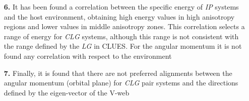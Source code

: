 \begin{enumerate}
\item[\textbf{6.}] It has been found a correlation between the specific
energy of \textit{IP} systems and the host environment, obtaining high
energy values in high anisotropy regions and lower values in middle 
anisotropy zones. This correlation selects a range of energy for 
\textit{CLG} systems, although this range is not consistent with the 
range defined by the \textit{LG} in CLUES. For the angular momentum it is
not found any correlation with respect to the environment


\item[\textbf{7.}] Finally, it is found that there are not preferred 
alignments between the angular momentum (orbital plane) for \textit{CLG} 
pair systems and the directions defined by the eigen-vector of the V-web


\end{enumerate}


